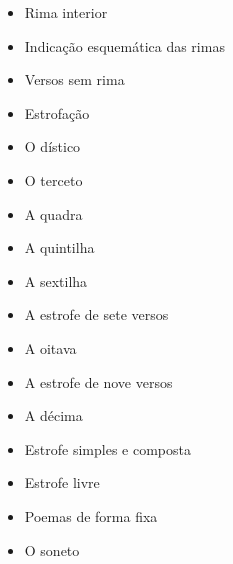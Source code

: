 \documentclass[a4paper,12pt]{article}[abntex2]
\begin{document}
\begin{itemize}
    \item Rima interior
    \item Indicação esquemática das rimas
    \item Versos sem rima
    \item Estrofação
    \item O dístico
    \item O terceto
    \item A quadra
    \item A quintilha
    \item A sextilha
    \item A estrofe de sete versos
    \item A oitava
    \item A estrofe de nove versos
    \item A décima
    \item Estrofe simples e composta
    \item Estrofe livre
    \item Poemas de forma fixa
    \item O soneto
\end{itemize}
\end{document}
